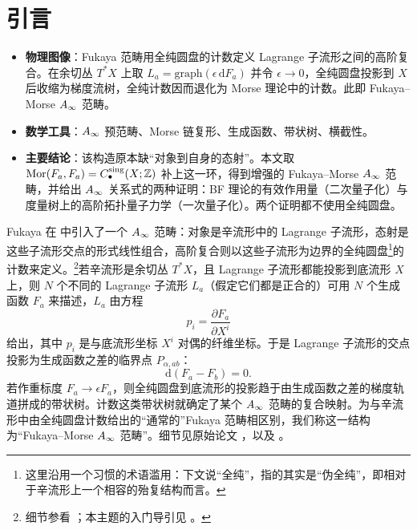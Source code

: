 \section{引言}\label{sec:1}


\begin{takeaway}
\begin{itemize}
  \item \textbf{物理图像}：Fukaya 范畴用全纯圆盘的计数定义 Lagrange 子流形之间的高阶复合。在余切丛 $T^*X$ 上取 $L_a=\mathrm{graph}(\epsilon\,\mathrm{d}F_a)$ 并令 $\epsilon\to0$，全纯圆盘投影到 $X$ 后收缩为梯度流树，全纯计数因而退化为 Morse 理论中的计数。此即 Fukaya--Morse $A_\infty$ 范畴。
  \item \textbf{数学工具}：$A_\infty$ 预范畴、Morse 链复形、生成函数、带状树、横截性。
  \item \textbf{主要结论}：该构造原本缺“对象到自身的态射”。本文取 $\operatorname{Mor}(F_a,F_a)=C^{\mathrm{sing}}_\bullet(X;\mathbb Z)$ 补上这一环，得到增强的 Fukaya--Morse $A_\infty$ 范畴，并给出 $A_\infty$ 关系式的两种证明：BF 理论的有效作用量（二次量子化）与度量树上的高阶拓扑量子力学（一次量子化）。两个证明都不使用全纯圆盘。
\end{itemize}
\end{takeaway}

Fukaya 在 \cite{fukaya} 中引入了一个 $A_\infty$ 范畴：对象是辛流形中的 Lagrange 子流形，态射是这些子流形交点的形式线性组合，高阶复合则以这些子流形为边界的全纯圆盘\footnote{这里沿用一个习惯的术语滥用：下文说“全纯”，指的其实是“伪全纯”，即相对于辛流形上一个相容的殆复结构而言。}的计数来定义。\footnote{细节参看 \cite{fukayaoh,seidel}；本主题的入门导引见 \cite{auroux}。}若辛流形是余切丛 $T^*X$，且 Lagrange 子流形都能投影到底流形 $X$ 上，则 $N$ 个不同的 Lagrange 子流形 $L_a$（假定它们都是正合的）可用 $N$ 个生成函数 $F_a$ 来描述，$L_a$ 由方程
\begin{equation*}
  p_i=\frac{\partial F_a}{\partial X^i}
\end{equation*}
给出，其中 $p_i$ 是与底流形坐标 $X^i$ 对偶的纤维坐标。于是 Lagrange 子流形的交点投影为生成函数之差的临界点 $P_{\alpha,ab}$：
\begin{equation*}
  \mathrm{d}(F_a-F_b)=0.
\end{equation*}
若作重标度 $F_a\to\epsilon F_a$，则全纯圆盘到底流形的投影趋于由生成函数之差的梯度轨道拼成的带状树。计数这类带状树就确定了某个 $A_\infty$ 范畴的复合映射。为与辛流形中由全纯圆盘计数给出的“通常的”Fukaya 范畴相区别，我们称这一结构为“Fukaya--Morse $A_\infty$ 范畴”。细节见原始论文 \cite{fukaya,fukayaoh}，以及 \cite{kontsevichsoibelman}。

